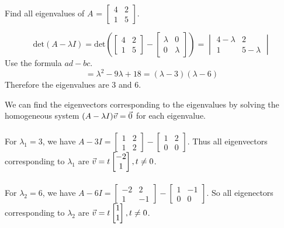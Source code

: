 \documentclass[english, 12pt]{article}
\begin{document}
\begin{exmp}
Find all eigenvalues of $A$ = $\begin{bmatrix} 4 & 2 \\ 1 & 5 \end{bmatrix}$.

\begin{sol}
\[\text{det}(A - \lambda I) = \text{det}\left(\begin{bmatrix} 4 & 2 \\ 1 & 5 \end{bmatrix} - \begin{bmatrix} \lambda & 0 \\ 0 & \lambda \end{bmatrix}\right) = \begin{vmatrix} 4 - \lambda & 2 \\ 1 & 5 - \lambda \end{vmatrix}\]
Use the formula $ad - bc$.
\[= \lambda^2 - 9 \lambda + 18 = (\lambda - 3) (\lambda - 6)\]
Therefore the eigenvalues are $3$ and $6$.
\end{sol}
\end{exmp}

\begin{exmp}
We can find the eigenvectors corresponding to the eigenvalues by solving the homogeneous system $(A - \lambda I) \vec{v} = \vec{0}$ for each eigenvalue. \\\\
For $\lambda_1 = 3$, we have $A - 3I = \begin{bmatrix} 1 & 2 \\ 1 & 2 \end{bmatrix} - \begin{bmatrix} 1 & 2 \\ 0 & 0 \end{bmatrix}$. Thus all eigenvectors corresponding to $\lambda_1$ are $\vec{v} = t \begin{bmatrix} -2 \\ 1 \end{bmatrix}, t \neq 0$. \\\\
For $\lambda_2 = 6$, we have $A - 6I = \begin{bmatrix} -2 & 2 \\ 1 & -1 \end{bmatrix} - \begin{bmatrix} 1 & -1 \\ 0 & 0 \end{bmatrix}$. So all eigenectors corresponding to $\lambda_2$ are $\vec{v} = t \begin{bmatrix} 1 \\ 1 \end{bmatrix}, t \neq 0$.
\end{exmp}
\end{document}
